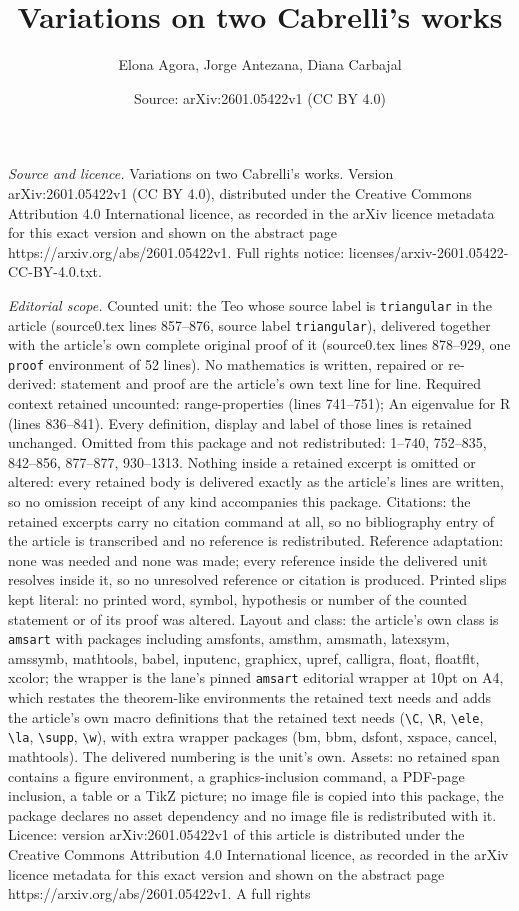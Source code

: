 \documentclass[10pt,a4paper]{amsart}
\title[Variations on two Cabrelli's works]{Variations on two Cabrelli's works}
\author{Elona Agora, Jorge Antezana, Diana Carbajal}
\date{Source: arXiv:2601.05422v1 (CC BY 4.0)}
\begin{document}
\maketitle

\noindent\emph{Source and licence.} Variations on two Cabrelli's works. Version arXiv:2601.05422v1 (CC BY 4.0), distributed under the Creative Commons Attribution 4.0 International licence, as recorded in the arXiv licence metadata for this exact version and shown on the abstract page https://arxiv.org/abs/2601.05422v1. Full rights notice: licenses/arxiv-2601.05422-CC-BY-4.0.txt.\par\smallskip

\noindent\textit{Editorial scope.} Counted unit: the Teo whose source label is \texttt{triangular} in the article (source0.tex lines 857--876, source label \texttt{triangular}), delivered together with the article's own complete original proof of it (source0.tex lines 878--929, one \texttt{proof} environment of 52 lines). No mathematics is written, repaired or re-derived: statement and proof are the article's own text line for line. Required context retained uncounted: range-properties (lines 741--751); An eigenvalue for R (lines 836--841). Every definition, display and label of those lines is retained unchanged. Omitted from this package and not redistributed: 1--740, 752--835, 842--856, 877--877, 930--1313. Nothing inside a retained excerpt is omitted or altered: every retained body is delivered exactly as the article's lines are written, so no omission receipt of any kind accompanies this package. Citations: the retained excerpts carry no citation command at all, so no bibliography entry of the article is transcribed and no reference is redistributed. Reference adaptation: none was needed and none was made; every reference inside the delivered unit resolves inside it, so no unresolved reference or citation is produced. Printed slips kept literal: no printed word, symbol, hypothesis or number of the counted statement or of its proof was altered. Layout and class: the article's own class is \texttt{amsart} with packages including amsfonts, amsthm, amsmath, latexsym, amssymb, mathtools, babel, inputenc, graphicx, upref, calligra, float, floatflt, xcolor; the wrapper is the lane's pinned \texttt{amsart} editorial wrapper at 10pt on A4, which restates the theorem-like environments the retained text needs and adds the article's own macro definitions that the retained text needs (\texttt{\textbackslash C}, \texttt{\textbackslash R}, \texttt{\textbackslash ele}, \texttt{\textbackslash la}, \texttt{\textbackslash supp}, \texttt{\textbackslash w}), with extra wrapper packages (bm, bbm, dsfont, xspace, cancel, mathtools). The delivered numbering is the unit's own. Assets: no retained span contains a figure environment, a graphics-inclusion command, a PDF-page inclusion, a table or a TikZ picture; no image file is copied into this package, the package declares no asset dependency and no image file is redistributed with it. Licence: version arXiv:2601.05422v1 of this article is distributed under the Creative Commons Attribution 4.0 International licence, as recorded in the arXiv licence metadata for this exact version and shown on the abstract page https://arxiv.org/abs/2601.05422v1. A full rights 
\end{document}

